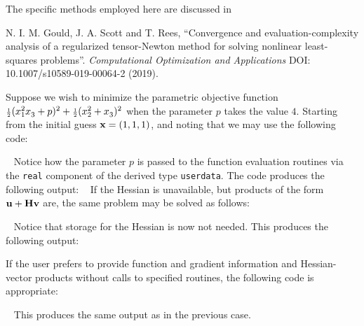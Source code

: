 \documentclass{galahad}
\begin{document}
\noindent
The specific methods employed here are discussed in
\vspace*{1mm}

\noindent
N. I. M. Gould, J. A. Scott and T. Rees,
``Convergence and evaluation-complexity analysis of a regularized
tensor-Newton method for solving nonlinear least-squares problems''.
{\em Computational Optimization and Applications}
DOI: 10.1007/s10589-019-00064-2 (2019).


\galexamples
Suppose we wish to minimize the parametric objective function
${\scriptstyle \frac{1}{2}}  ( x_1^2 x_3^{} + p )^2 + {\scriptstyle \frac{1}{2}} (x_2^2 + x_3^{} )^2$
when the parameter $p$ takes the value $4$. Starting from the
initial guess ${\mathbf{x}} = (1,1,1)$, and noting that
we may use the following code:

{\tt \small
\VerbatimInput{\packageexample}
}
\noindent
Notice how the parameter $p$ is passed to the function evaluation
routines via the {\tt real} component of the derived type {\tt userdata}.
The code produces the following output:
{\tt \small
\VerbatimInput{\packageresults}
}
\noindent
If the Hessian is unavailable, but products of the form
${\mathbf{u}} + {\mathbf{H}} {\mathbf{v}}$ are, the same problem may be solved as follows:

{\tt \small
\VerbatimInput{\packageexampleb}
}
\noindent
Notice that storage for the Hessian is now not needed.
This produces the %
following output:
{\tt \small
\VerbatimInput{\packageresultsb}
}
\noindent

If the user prefers to provide function and gradient information and
Hessian-vector products
without calls to specified routines, the following code is appropriate:

{\tt \small
\VerbatimInput{\packageexamplec}
}
\noindent
This produces the same output as in the previous case.
\noindent
\end{document}
